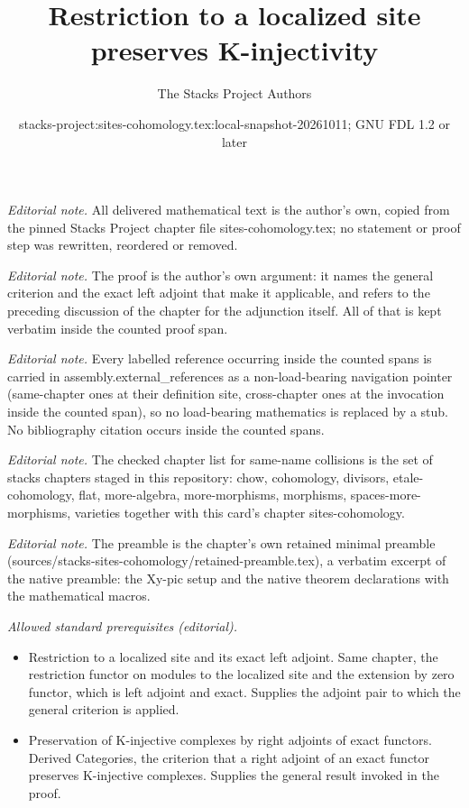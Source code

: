\documentclass[10pt,a4paper]{amsart}
\title{Restriction to a localized site preserves K-injectivity}
\author{The Stacks Project Authors}
\date{stacks-project:sites-cohomology.tex:local-snapshot-20261011; GNU FDL 1.2 or later}
\theoremstyle{plain}
\theoremstyle{definition}
\theoremstyle{remark}
\numberwithin{equation}{subsection}
\begin{document}
\maketitle
\noindent\textit{Editorial note.} All delivered mathematical text is the author's own, copied from the pinned Stacks Project chapter file sites-cohomology.tex; no statement or proof step was rewritten, reordered or removed.\par\medskip
\noindent\textit{Editorial note.} The proof is the author's own argument: it names the general criterion and the exact left adjoint that make it applicable, and refers to the preceding discussion of the chapter for the adjunction itself. All of that is kept verbatim inside the counted proof span.\par\medskip
\noindent\textit{Editorial note.} Every labelled reference occurring inside the counted spans is carried in assembly.external\_references as a non-load-bearing navigation pointer (same-chapter ones at their definition site, cross-chapter ones at the invocation inside the counted span), so no load-bearing mathematics is replaced by a stub. No bibliography citation occurs inside the counted spans.\par\medskip
\noindent\textit{Editorial note.} The checked chapter list for same-name collisions is the set of stacks chapters staged in this repository: chow, cohomology, divisors, etale-cohomology, flat, more-algebra, more-morphisms, morphisms, spaces-more-morphisms, varieties together with this card's chapter sites-cohomology.\par\medskip
\noindent\textit{Editorial note.} The preamble is the chapter's own retained minimal preamble (sources/stacks-sites-cohomology/retained-preamble.tex), a verbatim excerpt of the native preamble: the Xy-pic setup and the native theorem declarations with the mathematical macros.\par\medskip
\noindent\textit{Allowed standard prerequisites (editorial).}\begin{itemize}
\item Restriction to a localized site and its exact left adjoint. Same chapter, the restriction functor on modules to the localized site and the extension by zero functor, which is left adjoint and exact. Supplies the adjoint pair to which the general criterion is applied.
\item Preservation of K-injective complexes by right adjoints of exact functors. Derived Categories, the criterion that a right adjoint of an exact functor preserves K-injective complexes. Supplies the general result invoked in the proof.
\end{itemize}\medskip
\end{document}
